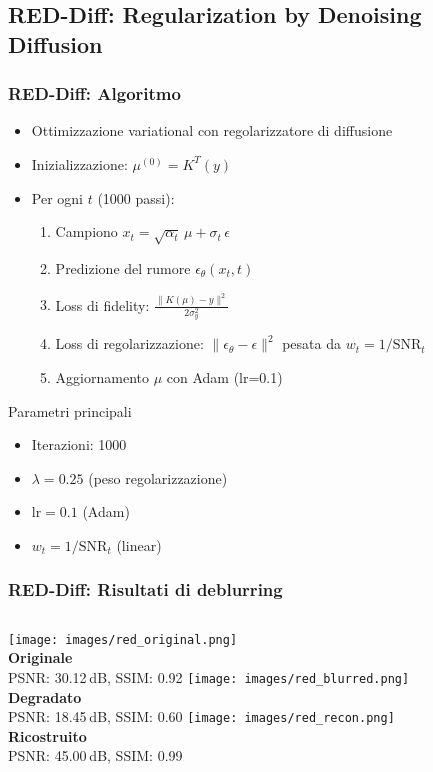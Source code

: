 \subsection{RED-Diff: Regularization by Denoising Diffusion}

\begin{frame}
  \frametitle{RED-Diff: Algoritmo}
  \begin{itemize}
    \item Ottimizzazione variational con regolarizzatore di diffusione
    \item Inizializzazione: $\mu^{(0)} = K^T(y)$
    \item Per ogni $t$ (1000 passi):
      \begin{enumerate}
        \item Campiono $x_t = \sqrt{\alpha_t}\,\mu + \sigma_t\,\epsilon$
        \item Predizione del rumore $\epsilon_\theta(x_t,t)$  
        \item Loss di fidelity: $\frac{\|K(\mu)-y\|^2}{2\sigma_y^2}$
        \item Loss di regolarizzazione: $\|\epsilon_\theta - \epsilon\|^2$ pesata da $w_t=1/\mathrm{SNR}_t$
        \item Aggiornamento $\mu$ con Adam (lr=0.1)
      \end{enumerate}
  \end{itemize}
  \begin{block}{Parametri principali}
    \begin{itemize}
      \item Iterazioni: 1000  
      \item $\lambda=0.25$ (peso regolarizzazione)  
      \item $\mathrm{lr}=0.1$ (Adam)  
      \item $w_t = 1/\mathrm{SNR}_t$ (linear)
    \end{itemize}
  \end{block}
\end{frame}

\begin{frame}
  \frametitle{RED-Diff: Risultati di deblurring}
  \begin{columns}
      \centering
      \texttt{[image: images/red\_original.png]}\\
      \small \textbf{Originale}\\
      PSNR: 30.12 dB, SSIM: 0.92
      \centering
      \texttt{[image: images/red\_blurred.png]}\\
      \small \textbf{Degradato}\\
      PSNR: 18.45 dB, SSIM: 0.60
      \centering
      \texttt{[image: images/red\_recon.png]}\\
      \small \textbf{Ricostruito}\\
      PSNR: 45.00 dB, SSIM: 0.99
  \end{columns}
\end{frame}
